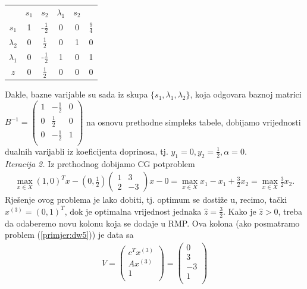 \documentclass[a4paper, utf8, 11pt, colorlinks]{book}
\begin{document}
\begin{center}
	
	\begin{tabular}{c|ccccc}
	             	&$s_1$     &    $ s_2$                &  $\lambda_1$   & $s_2$     &                \\
		$s_1$	    &   1      &   -$\frac{1}{2}$         &   0         &     0         &  $\frac{9}{4}$ \\
		$\lambda_2$ &   0      &    $\frac{1}{2}$         &   0         &     1         &  0             \\
		$\lambda_1$ &   0      &    -$\frac{1}{2}$        &   1         &     0         &  1             \\ \hline
		$z$         &   0      &    $\frac{1}{2}$         &   0         &    0          &  0
	\end{tabular}
\end{center} 
Dakle, bazne varijable su sada iz skupa $\{s_1, \lambda_1, \lambda_2\}$, koja odgovara baznoj matrici 
$B^{-1} = 
\begin{pmatrix}
	   1 & -\frac{1}{2}    &  0 \\
	   0 & \frac{1}{2}     &  0  \\
	   0 & -\frac{1}{2}    &  1  \\
\end{pmatrix}$
na osnovu prethodne simpleks tabele, dobijamo   vrijednosti dualnih varijabli iz koeficijenta doprinosa, tj. $y_1 = 0, y_2 = \frac{1}{2}, \alpha = 0$. \\
\emph{Iteracija 2.} Iz prethodnog dobijamo CG potproblem 
\begin{align}
	 \max_{x \in X} (1, 0)^T x - \left(0, \frac{1}{2}\right)\left(\begin{array}{cc}
	 	1 & 3 \\
	 	2 & -3
	 \end{array}\right)  x   - 0 = \max_{x \in X}x_1 - x_1 + \frac{3}{2}x_2 = \max_{x \in X} \frac{3}{2}x_2.
\end{align}
Rješenje ovog problema je lako dobiti, tj. optimum se dostiže u, recimo,  tački $x^{(3)}= (0, 1)^T$, dok je optimalna vrijednost jednaka $\hat{z}= \frac{3}{2}$. Kako je $\hat{z} > 0$, treba da odaberemo novu kolonu koja se dodaje u RMP. 
Ova kolona (ako posmatramo problem (\ref{primjer:dw5})) je   data sa 
\begin{align}
	V =   \begin{pmatrix}
		c^T  x^{(3)}\\
		A  x^{(3)}  \\
		1     \\
	\end{pmatrix} = \begin{pmatrix}
		0 \\
		3  \\
		-3  \\
		1\\  
	\end{pmatrix}
\end{align}
\end{document}
